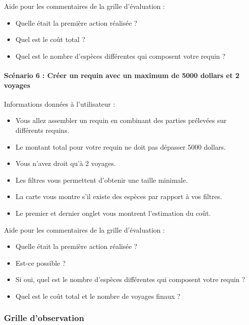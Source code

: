 \documentclass{article}
\begin{document}
Aide pour les commentaires de la grille d'évaluation :
\begin{itemize}
	\item Quelle était la première action réalisée ?
	\item Quel est le coût total ?
	\item Quel est le nombre d'espèces différentes qui composent votre requin ?
\end{itemize}

\paragraph{Scénario 6 : Créer un requin avec un maximum de 5000 dollars et 2 voyages}
Informations données à l'utilisateur :
\begin{itemize}
	\item Vous allez assembler un requin en combinant des parties prélevées sur différents requins.
	\item Le montant total pour votre requin ne doit pas dépasser 5000 dollars.
	\item Vous n'avez droit qu'à 2 voyages.
	\item Les filtres vous permettent d'obtenir une taille minimale.
	\item La carte vous montre s'il existe des espèces par rapport à vos filtres.
	\item Le premier et dernier onglet vous montrent l'estimation du coût.
\end{itemize}

Aide pour les commentaires de la grille d'évaluation :
\begin{itemize}
	\item Quelle était la première action réalisée ?
	\item Est-ce possible ?
	\item Si oui, quel est le nombre d'espèces différentes qui composent votre requin ?
	\item Quel est le coût total et le nombre de voyages finaux ?
\end{itemize}

\subsubsection{Grille d'observation}
\end{document}
